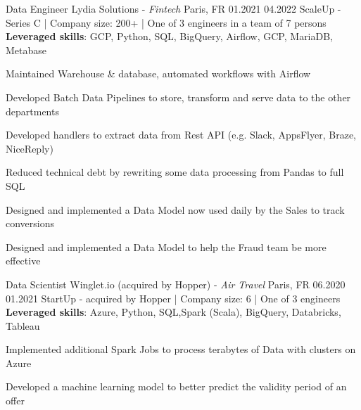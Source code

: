 \begin{cventries}
\cventry
{Data Engineer} %
{Lydia Solutions - \emph{Fintech}} %
{Paris, FR} %
{01.2021} %
{04.2022} %
{ScaleUp - Series C | Company size: 200+ | One of 3 engineers in a team of 7 persons} %
{\textbf{Leveraged skills}: GCP, Python, SQL, BigQuery, Airflow, GCP, MariaDB, Metabase} %
{
  \begin{cvitems} %
    \item {Maintained Warehouse \& database,  automated workflows with Airflow}
    \item {Developed Batch Data Pipelines to store, transform and serve data to the other departments}
    \item {Developed handlers to extract data from Rest API (e.g. Slack, AppsFlyer, Braze, NiceReply)}
    \item {Reduced technical debt by rewriting some data processing from Pandas to full SQL}
    \item {Designed and implemented a Data Model now used daily by the Sales to track conversions}
    \item {Designed and implemented a Data Model to help the Fraud team be more effective}
  \end{cvitems}
}

  \cventry
    {Data Scientist} %
    {Winglet.io (acquired by Hopper) - \emph{Air Travel}} %
    {Paris, FR} %
    {06.2020} %
    {01.2021} %
    {StartUp - acquired by Hopper | Company size: 6 | One of 3 engineers  } %
    {\textbf{Leveraged skills}: Azure, Python, SQL,Spark (Scala), BigQuery, Databricks, Tableau} %
    {
      \begin{cvitems} %
       \item {Implemented additional Spark Jobs to process terabytes of Data with clusters on Azure}
       \item {Developed a machine learning model to better predict the validity period of an offer }
      \end{cvitems}
    }


\end{cventries}
